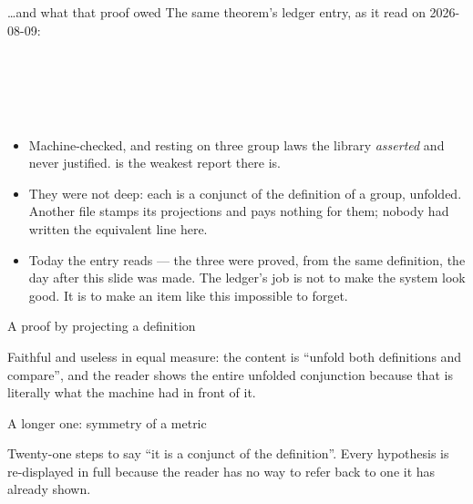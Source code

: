 \documentclass[11pt,aspectratio=169]{beamer}
\begin{document}
\begin{frame}{\dots and what that proof owed}
  The same theorem's ledger entry, as it read on 2026-08-09:
  \begin{center}
    \\[1ex]
    \\[0.5ex]
    \\
    \\
  \end{center}
  \vfill
  \begin{itemize}
    \item Machine-checked, and resting on three group laws the library
          \emph{asserted} and never justified.  is the
          weakest report there is.
    \item They were not deep: each is a conjunct of the definition of a group,
          unfolded. Another file stamps its projections  and
          pays nothing for them; nobody had written the equivalent line here.
    \item Today the entry reads  ---
          the three were proved, from the same definition, the day after this
          slide was made. The ledger's job is not to make the system look
          good. It is to make an item like this impossible to forget.
  \end{itemize}
\end{frame}

\begin{frame}{A proof by projecting a definition}
  \begin{center}
    \tiny
    
  \end{center}
  \vfill
  \footnotesize
  Faithful and useless in equal measure: the content is ``unfold both
  definitions and compare'', and the reader shows the entire unfolded
  conjunction because that is literally what the machine had in front of it.
\end{frame}

\begin{frame}[shrink=25]{A longer one: symmetry of a metric}
  \tiny
  
  \vfill
  {\scriptsize Twenty-one steps to say ``it is a conjunct of the definition''.
  Every hypothesis is re-displayed in full because the reader has no way to
  refer back to one it has already shown.}
\end{frame}
\end{document}
